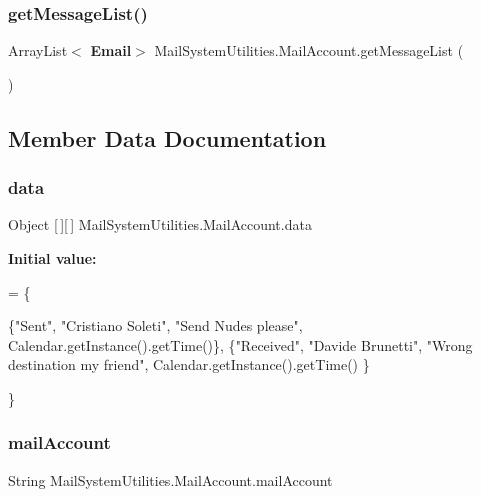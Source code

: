 \subsubsection{get\+Message\+List()}
{\footnotesize\ttfamily Array\+List$<$\textbf{ Email}$>$ Mail\+System\+Utilities.\+Mail\+Account.\+get\+Message\+List (\begin{DoxyParamCaption}{ }\end{DoxyParamCaption})}



\subsection{Member Data Documentation}
\mbox{\label{class_mail_system_utilities_1_1_mail_account_a606be5a091837231c498545969c9d44c}} 
\subsubsection{data}
{\footnotesize\ttfamily Object [$\,$][$\,$] Mail\+System\+Utilities.\+Mail\+Account.\+data}

{\bfseries Initial value\+:}
\begin{DoxyCode}
= \{
            
            \{\textcolor{stringliteral}{"Sent"}, \textcolor{stringliteral}{"Cristiano Soleti"}, \textcolor{stringliteral}{"Send Nudes please"}, Calendar.getInstance().getTime()\},
            \{\textcolor{stringliteral}{"Received"}, \textcolor{stringliteral}{"Davide Brunetti"}, \textcolor{stringliteral}{"Wrong destination my friend"}, Calendar.getInstance().getTime()
      \}
            
    \}
\end{DoxyCode}
\mbox{\label{class_mail_system_utilities_1_1_mail_account_a7a815ce68a883d5c415f6c41e92fb974}} 
\subsubsection{mail\+Account}
{\footnotesize\ttfamily String Mail\+System\+Utilities.\+Mail\+Account.\+mail\+Account\hspace{0.3cm}{\ttfamily [private]}}

